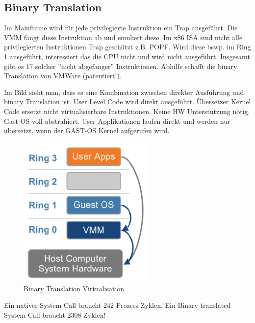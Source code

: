 \subsection{Binary Translation}
Im Mainframe wird für jede privilegierte Instruktion ein Trap ausgeführt. Die VMM fängt diese Instruktion ab und emuliert diese. Im x86 ISA sind nicht alle privilegierten Instruktionen Trap geschützt z.B. POPF. Wird diese bswp. im Ring 1 ausgeführt, interessiert das die CPU nicht und wird nicht ausgeführt. Insgesamt gibt es 17 solcher ''nicht abgefanger'' Instruktionen. Abhilfe schafft die binary Translation von VMWare (patentiert!).

Im Bild sieht man, dass es eine Kombination zwischen direkter Ausführung und binary Translation ist. User Level Code wird direkt ausgeführt. Übersetzer Kernel Code ersetzt nicht virtualisierbare Instruktionen. Keine HW Unterstützung nötig. Gast OS voll abstrahiert. User Applikationen laufen direkt und werden nur übersetzt, wenn der GAST-OS Kernel aufgerufen wird.
\begin{figure}[h!]
\centering
\includegraphics[width=0.4\linewidth]{fig/binary-translation-virt}
\caption{Binary Translation Virtualisation}
\label{fig:binary-translation-virt}
\end{figure}
Ein nativer System Call braucht 242 Prozess Zyklen. Ein Binary translated System Call braucht 2308 Zyklen!

